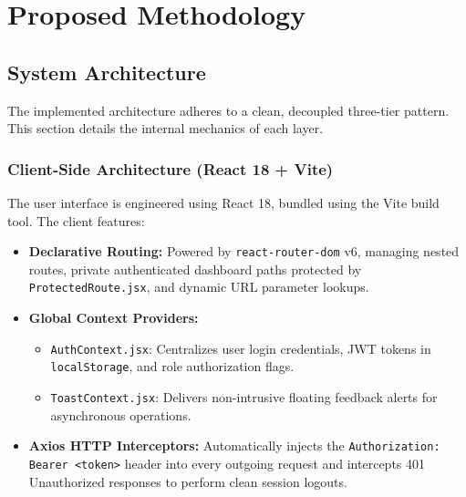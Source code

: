\newpage
\chapter{Proposed Methodology}

\section{System Architecture}
The implemented architecture adheres to a clean, decoupled three-tier pattern. This section details the internal mechanics of each layer.

\subsection{Client-Side Architecture (React 18 + Vite)}
The user interface is engineered using React 18, bundled using the Vite build tool. The client features:
\begin{itemize}
    \item \textbf{Declarative Routing:} Powered by \texttt{react-router-dom} v6, managing nested routes, private authenticated dashboard paths protected by \texttt{ProtectedRoute.jsx}, and dynamic URL parameter lookups.
    \item \textbf{Global Context Providers:}
    \begin{itemize}
        \item \texttt{AuthContext.jsx}: Centralizes user login credentials, JWT tokens in \texttt{localStorage}, and role authorization flags.
        \item \texttt{ToastContext.jsx}: Delivers non-intrusive floating feedback alerts for asynchronous operations.
    \end{itemize}
    \item \textbf{Axios HTTP Interceptors:} Automatically injects the \texttt{Authorization: Bearer <token>} header into every outgoing request and intercepts 401 Unauthorized responses to perform clean session logouts.
\end{itemize}


